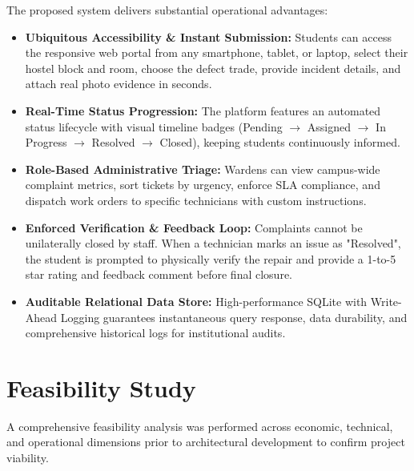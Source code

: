 \documentclass[10pt]{report}
\begin{document}
The proposed system delivers substantial operational advantages:
\begin{itemize}
\item \textbf{Ubiquitous Accessibility \& Instant Submission:} Students can access the responsive web portal from any smartphone, tablet, or laptop, select their hostel block and room, choose the defect trade, provide incident details, and attach real photo evidence in seconds.
\item \textbf{Real-Time Status Progression:} The platform features an automated status lifecycle with visual timeline badges (Pending $\rightarrow$ Assigned $\rightarrow$ In Progress $\rightarrow$ Resolved $\rightarrow$ Closed), keeping students continuously informed.
\item \textbf{Role-Based Administrative Triage:} Wardens can view campus-wide complaint metrics, sort tickets by urgency, enforce SLA compliance, and dispatch work orders to specific technicians with custom instructions.
\item \textbf{Enforced Verification \& Feedback Loop:} Complaints cannot be unilaterally closed by staff. When a technician marks an issue as "Resolved", the student is prompted to physically verify the repair and provide a 1-to-5 star rating and feedback comment before final closure.
\item \textbf{Auditable Relational Data Store:} High-performance SQLite with Write-Ahead Logging guarantees instantaneous query response, data durability, and comprehensive historical logs for institutional audits.
\end{itemize}

\section{Feasibility Study}
\hspace{0.5cm}A comprehensive feasibility analysis was performed across economic, technical, and operational dimensions prior to architectural development to confirm project viability.
\end{document}
